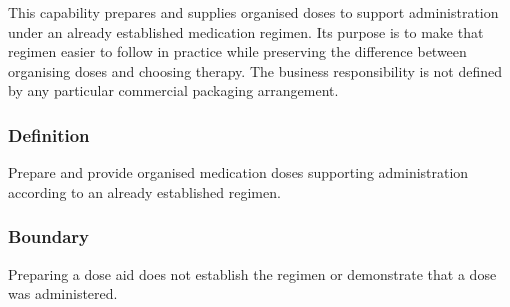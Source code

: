 This capability prepares and supplies organised doses to support administration under an already established medication regimen. Its purpose is to make that regimen easier to follow in practice while preserving the difference between organising doses and choosing therapy. The business responsibility is not defined by any particular commercial packaging arrangement.

\subsubsection*{Definition}

Prepare and provide organised medication doses supporting administration according to an already established regimen.

\subsubsection*{Boundary}

Preparing a dose aid does not establish the regimen or demonstrate that a dose was administered.

